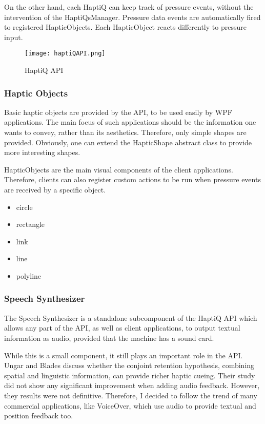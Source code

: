 On the other hand, each HaptiQ can keep track of pressure events, without the intervention of the HaptiQsManager. Pressure data events are automatically fired to registered HapticObjects. Each HapticObject reacts differently to pressure input. 

\begin{figure}[H]
  \centering
  \texttt{[image: haptiQAPI.png]}
  \caption{HaptiQ API}
  \label{fig:haptiQ_api}
\end{figure}

\subsubsection{Haptic Objects}
Basic haptic objects are provided by the API, to be used easily by WPF applications. The main focus of such applications should be the information one wants to convey, rather than its aesthetics. Therefore, only simple shapes are provided. Obviously, one can extend the HapticShape abstract class to provide more interesting shapes.

HapticObjects are the main visual components of the client applications. Therefore, clients can also register custom actions to be run when pressure events are received by a specific object.


\begin{itemize}
	\item circle
    \item rectangle
    \item link
    \item line
    \item polyline
\end{itemize}

\subsubsection{Speech Synthesizer}

The Speech Synthesizer is a standalone subcomponent of the HaptiQ API which allows any part of the API, as well as client applications, to output textual information as audio, provided that the machine has a sound card.

While this is a small component, it still plays an important role in the API. Ungar and Blades \cite{ungar2000can} discuss whether the conjoint retention hypothesis, combining spatial and linguistic information, can provide richer haptic cueing. Their study did not show any significant improvement when adding audio feedback. However, they results were not definitive. Therefore, I decided to follow the trend of many commercial applications, like VoiceOver, which use audio to provide textual and position feedback too.

